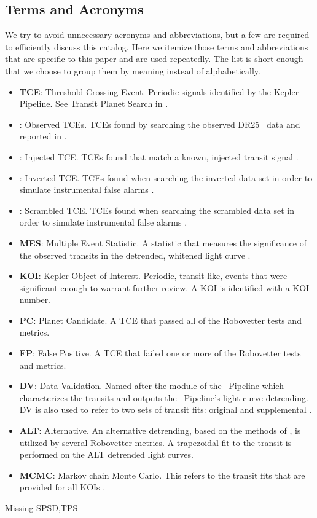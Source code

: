 \subsection{Terms and Acronyms}
\label{abbrev}
We try to avoid unnecessary acronyms and abbreviations, but a few are required to efficiently discuss this catalog.  Here we itemize those terms and abbreviations that are specific to this paper and are used repeatedly. The list is short enough that we choose to group them by meaning instead of alphabetically. 

\begin{itemize}

\item[] \textbf{TCE}: Threshold Crossing Event. Periodic signals identified by the Kepler Pipeline. See Transit Planet Search in \citep{JenkinsKDPH}.
\item[] \textbf{\opstce}: Observed TCEs. TCEs found by searching the observed DR25 \Kepler\ data and reported in \citet{Twicken2016}.
\item[] \textbf{\injtce}: Injected TCE. TCEs found that match a known, injected transit signal \citet{Christiansen2017}.
\item[] \textbf{\invtce}: Inverted TCE. TCEs found when searching the inverted data set in order to simulate instrumental false alarms \citet{Coughlin2017}.
\item[] \textbf{\scrtce}: Scrambled TCE. TCEs found when searching the scrambled data set in order to simulate instrumental false alarms \citet{Coughlin2017}.
\item[] \textbf{MES}: Multiple Event Statistic. A statistic that measures the significance of the observed transits in the detrended, whitened light curve \citep{Jenkins2002a}.
\item[] \textbf{KOI}: Kepler Object of Interest. Periodic, transit-like, events that were significant enough to warrant further review. A KOI is identified with a KOI number.
\item[] \textbf{PC}: Planet Candidate. A TCE that passed all of the Robovetter tests and metrics.  
\item[] \textbf{FP}: False Positive. A TCE that failed one or more of the Robovetter tests and metrics.
\item[] \textbf{DV}: Data Validation. Named after the module of the \Kepler\ Pipeline which characterizes the transits and outputs the \Kepler\ Pipeline's light curve detrending. DV is also used to refer to two sets of transit fits: original and supplemental \citet{JenkinsKDPH}.
\item[] \textbf{ALT}: Alternative. An alternative detrending, based on the methods of \citet{Garcia2010}, is utilized by several Robovetter metrics. A trapezoidal fit to the transit is performed on the ALT detrended light curves.
\item[] \textbf{MCMC}: Markov chain Monte Carlo. This refers to the transit fits that are provided for all KOIs \citep{Hoffman2017}.

\end{itemize}

Missing 
SPSD,TPS